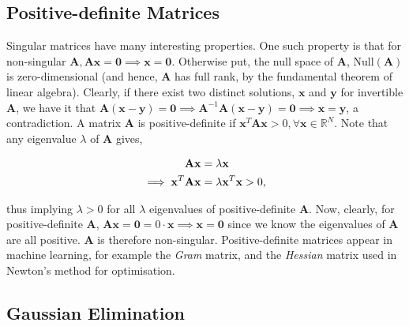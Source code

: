 \documentclass[11pt]{amsart}
\begin{document}
\subsection{Positive-definite Matrices}

Singular matrices have many interesting properties. One such property is that for non-singular $\mathbf{A}, \mathbf{A}\mathbf{x} = \mathbf{0} \implies \mathbf{x} = \mathbf{0}$. Otherwise put, the null space of $\mathbf{A}$, $\text{Null}(\mathbf{A})$ is zero-dimensional (and hence, $\mathbf{A}$ has full rank, by the fundamental theorem of linear algebra). Clearly, if there exist two distinct solutions, $\mathbf{x}$ and $\mathbf{y}$ for invertible $\mathbf{A}$, we have it that $\mathbf{A}(\mathbf{x} - \mathbf{y}) = \mathbf{0} \implies \mathbf{A}^{-1}\mathbf{A}(\mathbf{x} - \mathbf{y}) = \mathbf{0} \implies \mathbf{x} = \mathbf{y}$, a contradiction. A matrix $\mathbf{A}$ is positive-definite if $\mathbf{x}^T\mathbf{A}\mathbf{x} > 0, \forall \mathbf{x} \in \mathbb{R}^N$. Note that any eigenvalue $\lambda$ of $\mathbf{A}$ gives,

\begin{align}
\mathbf{A}\mathbf{x} &= \lambda\mathbf{x} \notag \\
\implies \mathbf{x}^T\mathbf{A}\mathbf{x} &= \lambda\mathbf{x}^T\mathbf{x} > 0, \notag
\end{align}

thus implying $\lambda > 0$ for all $\lambda$ eigenvalues of positive-definite $\mathbf{A}$. Now, clearly, for positive-definite $\mathbf{A}$, $\mathbf{A}\mathbf{x} = \mathbf{0} = 0 \cdot \mathbf{x} \implies \mathbf{x} = \mathbf{0}$ since we know the eigenvalues of $\mathbf{A}$ are all positive. $\mathbf{A}$ is therefore non-singular. Positive-definite matrices appear in machine learning, for example the \emph{Gram} matrix, and the \emph{Hessian} matrix used in Newton's method for optimisation.

\subsection{Gaussian Elimination}
\end{document}
